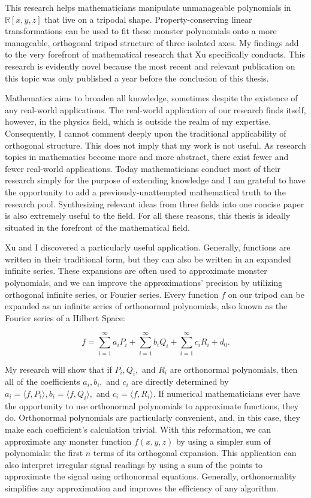 \documentclass[letterpaper, 12pt]{article}
\begin{document}
This research helps mathematicians manipulate unmanageable polynomials in $\mathbb{R}[x, y, z]$ that live on a tripodal shape. Property-conserving linear transformations can be used to fit these monster polynomials onto a more manageable, orthogonal tripod structure of three isolated axes. My findings add to the very forefront of mathematical research that Xu specifically conducts. This research is evidently novel because the most recent and relevant publication on this topic was only published a year before the conclusion of this thesis.

Mathematics aims to broaden all knowledge, sometimes despite the existence of any real-world applications. The real-world application of our research finds itself, however, in the physics field, which is outside the realm of my expertise. Consequently, I cannot comment deeply upon the traditional applicability of orthogonal structure. This does not imply that my work is not useful. As research topics in mathematics become more and more abstract, there exist fewer and fewer real-world applications. Today mathematicians conduct most of their research simply for the purpose of extending knowledge and I am grateful to have the opportunity to add a previously-unattempted mathematical truth to the research pool. Synthesizing relevant ideas from three fields into one concise paper is also extremely useful to the field. For all these reasons, this thesis is ideally situated in the forefront of the mathematical field.

Xu and I discovered a particularly useful application. Generally, functions are written in their traditional form, but they can also be written in an expanded infinite series. These expansions are often used to approximate monster polynomials, and we can improve the approximations' precision by utilizing orthogonal infinite series, or Fourier series. Every function $f$ on our tripod can be expanded as an infinite series of orthonormal polynomials, also known as the Fourier series of a Hilbert Space:

\vspace*{-1mm}
$$f = \sum_{i=1}^\infty a_i P_i + \sum_{i=1}^\infty b_i Q_i + \sum_{i=1}^\infty c_i R_i + d_0.$$

\vspace*{4mm}
\noindent My research will show that if $P_i, Q_i,$ and $ R_i$ are orthonormal polynomials, then all of the coefficients $a_i, b_i,$ and $c_i$ are directly determined by $a_i = \langle f, P_i\rangle, b_i = \langle f, Q_i\rangle,$ and $c_i = \langle f,R_i\rangle$. If numerical mathematicians ever have the opportunity to use orthonormal polynomials to approximate functions, they do. Orthonormal polynomials are particularly convenient, and, in this case, they make each coefficient's calculation trivial. With this reformation, we can approximate any monster function $f(x,y,z)$ by using a simpler sum of polynomials: the first $n$ terms of its orthogonal expansion. This application can also interpret irregular signal readings by using a sum of the points to approximate the signal using orthonormal equations. Generally, orthonormality simplifies any approximation and improves the efficiency of any algorithm.
\end{document}
